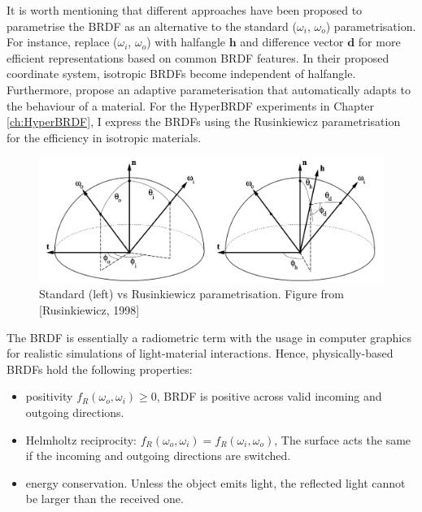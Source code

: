It is worth mentioning that different approaches have been proposed to parametrise the \gls{BRDF} as an alternative to the standard ($\omega_i$, $\omega_o$) parametrisation.  For instance, \citeauthor{rusinkiewicz1998new} \cite{rusinkiewicz1998new} replace ($\omega_i$, $\omega_o$)  with halfangle $\mathbf{h}$ and difference vector $\mathbf{d}$ for more efficient representations based on common \gls{BRDF} features. In their proposed coordinate system, isotropic \gls{BRDF}s become independent of halfangle. Furthermore, \citeauthor{dupuy2018adaptive} \cite{dupuy2018adaptive} propose an adaptive parameterisation that automatically adapts to the behaviour of a material. For the HyperBRDF experiments in Chapter \ref{ch:HyperBRDF}, I express the BRDFs using the Rusinkiewicz parametrisation \cite{rusinkiewicz1998new} for the efficiency in isotropic materials.


\begin{figure}[ht]
  \centering
   \includegraphics[width=\linewidth]{Images/Rusinkiewicz.png}
   \caption{Standard (left) vs Rusinkiewicz parametrisation. Figure from [Rusinkiewicz, 1998]}
   \label{fig:RusinkiewiczvsStandard}
\end{figure}


The \gls{BRDF} is essentially a radiometric term with the usage in computer graphics for realistic simulations of light-material interactions. Hence, physically-based \gls{BRDF}s hold the following properties:
\begin{itemize}
  \item positivity $f_R(\omega_o, \omega_i) \geq 0$, \gls{BRDF} is positive across valid incoming and outgoing directions.
  \item Helmholtz reciprocity: $f_R(\omega_o, \omega_i) = f_R(\omega_i, \omega_o)$, The surface acts the same if the incoming and outgoing directions are switched.
  \item energy conservation. Unless the object emits light, the reflected light cannot be larger than the received one.
\end{itemize}


